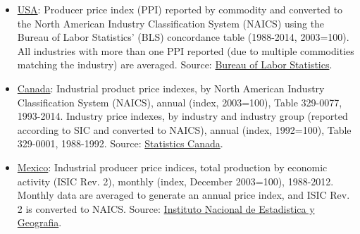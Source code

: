 \begin{spacing}{1}
\begin{itemize}
	\item \underline{USA}: Producer price index (PPI) reported by commodity and converted to the North American Industry Classification System (NAICS) using the Bureau of Labor Statistics' (BLS) concordance table (1988-2014, 2003=100). All industries with more than one PPI reported (due to multiple commodities matching the industry) are averaged. Source: \href{http://www.bls.gov/ppi/#data}{Bureau of Labor Statistics}. %
		
	\item \underline{Canada}: Industrial product price indexes, by North American Industry Classification System (NAICS), annual (index, 2003=100), Table 329-0077, 1993-2014. Industry price indexes, by industry and industry group (reported according to SIC and converted to NAICS), annual (index, 1992=100), Table 329-0001, 1988-1992. Source: \href{http://www5.statcan.gc.ca/cansim/a47}{Statistics Canada}. %

	\item \underline{Mexico}: Industrial producer price indices, total production by economic activity (ISIC Rev. 2), monthly (index, December 2003=100), 1988-2012. Monthly data are averaged to generate an annual price index, and ISIC Rev. 2 is converted to NAICS. Source: \href{http://www.inegi.org.mx/est/contenidos/proyectos/inp/INPP_CAB2003.aspx}{Instituto Nacional de Estadistica y Geografia}. %
	
	\end{itemize}


	
	

\end{spacing}
